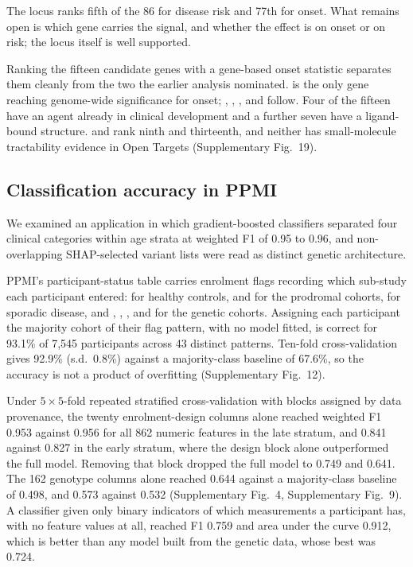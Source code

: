\documentclass[10pt]{article}
\begin{document}
The locus ranks fifth of the 86 for disease risk and 77th for onset. What remains open is which gene carries the signal, and whether the effect is on onset or on risk; the locus itself is well supported.

Ranking the fifteen candidate genes with a gene-based onset statistic separates them cleanly from
the two the earlier analysis nominated.  is the only gene reaching genome-wide
significance for onset; , , ,  and 
follow. Four of the fifteen have an agent already in clinical development and a further seven have
a ligand-bound structure.  and  rank ninth and thirteenth, and neither
has small-molecule tractability evidence in Open Targets (Supplementary Fig.~19).

\subsection*{Classification accuracy in PPMI}

We examined an application in which gradient-boosted classifiers separated four clinical
categories within age strata at weighted F1 of 0.95 to 0.96, and non-overlapping SHAP-selected
variant lists were read as distinct genetic architecture.

PPMI's participant-status table carries enrolment flags recording which sub-study each
participant entered:  for healthy controls,  and  for
the prodromal cohorts,  for sporadic disease, and , ,
,  and  for the genetic cohorts. Assigning each
participant the majority cohort of their flag pattern, with no model fitted, is correct for
93.1\% of 7,545 participants across 43 distinct patterns. Ten-fold cross-validation gives 92.9\%
(s.d.\ 0.8\%) against a majority-class baseline of 67.6\%, so the accuracy is not a product of overfitting
(Supplementary Fig.~12).

Under $5\times5$-fold repeated stratified cross-validation with blocks assigned by data
provenance, the twenty enrolment-design columns alone reached weighted F1 0.953 against 0.956 for
all 862 numeric features in the late stratum, and 0.841 against 0.827 in the early stratum, where
the design block alone outperformed the full model. Removing that block dropped the full model to
0.749 and 0.641. The 162 genotype columns alone reached 0.644 against a majority-class baseline
of 0.498, and 0.573 against 0.532 (Supplementary Fig.~4, Supplementary Fig.~9). A classifier given only binary indicators of which
measurements a participant has, with no feature values at all, reached F1 0.759 and area under the
curve 0.912, which is better than any model built from the genetic data, whose best was 0.724.
\end{document}
